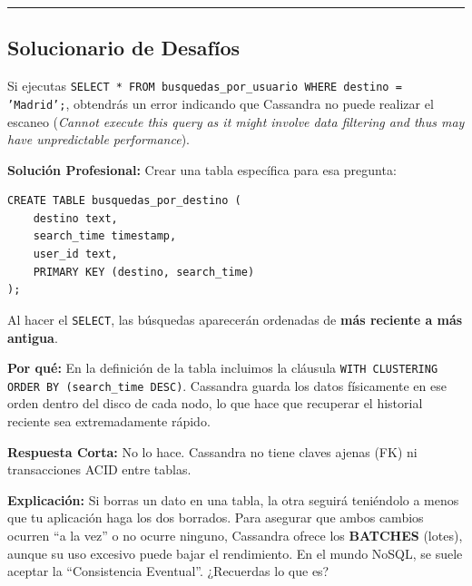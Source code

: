 \documentclass[12pt,a4paper]{article}
\begin{document}
\begin{center}\rule{0.5\linewidth}{0.5pt}\end{center}

\subsection{Solucionario de Desafíos}\label{solucionario-desafios}

\begin{tcolorbox}[title=Solución Desafío 1: El Filtro Imposible]
Si ejecutas \texttt{SELECT * FROM busquedas\_por\_usuario WHERE destino = 'Madrid';}, obtendrás un error indicando que Cassandra no puede realizar el escaneo (\textit{Cannot execute this query as it might involve data filtering and thus may have unpredictable performance}).

\textbf{Solución Profesional:} Crear una tabla específica para esa pregunta:
\begin{lstlisting}[language=CQL]
CREATE TABLE busquedas_por_destino (
    destino text,
    search_time timestamp,
    user_id text,
    PRIMARY KEY (destino, search_time)
);
\end{lstlisting}
\end{tcolorbox}

\begin{tcolorbox}[title=Solución Desafío 2: El Orden de los Datos]
Al hacer el \texttt{SELECT}, las búsquedas aparecerán ordenadas de \textbf{más reciente a más antigua}.

\textbf{Por qué:} En la definición de la tabla incluimos la cláusula \texttt{WITH CLUSTERING ORDER BY (search\_time DESC)}. Cassandra guarda los datos físicamente en ese orden dentro del disco de cada nodo, lo que hace que recuperar el historial reciente sea extremadamente rápido.
\end{tcolorbox}

\begin{tcolorbox}[title=Solución Desafío 3: Coherencia y ACID]
\textbf{Respuesta Corta:} No lo hace. Cassandra no tiene claves ajenas (FK) ni transacciones ACID entre tablas.

\textbf{Explicación:} Si borras un dato en una tabla, la otra seguirá teniéndolo a menos que tu aplicación haga los dos borrados. Para asegurar que ambos cambios ocurren \enquote{a la vez} o no ocurre ninguno, Cassandra ofrece los \textbf{BATCHES} (lotes), aunque su uso excesivo puede bajar el rendimiento. En el mundo NoSQL, se suele aceptar la \enquote{Consistencia Eventual}. ¿Recuerdas lo que es?
\end{tcolorbox}
\end{document}
